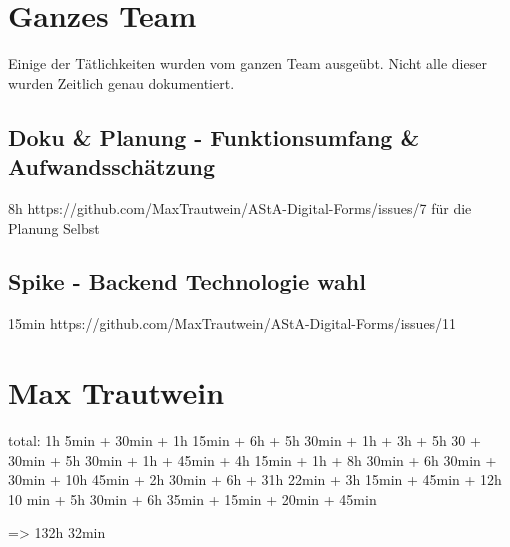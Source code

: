 \section{Ganzes Team}
Einige der Tätlichkeiten wurden vom ganzen Team ausgeübt.
Nicht alle dieser wurden Zeitlich genau dokumentiert.

\subsection{Doku & Planung - Funktionsumfang & Aufwandsschätzung}
8h
https://github.com/MaxTrautwein/AStA-Digital-Forms/issues/7
für die Planung Selbst

\subsection{Spike - Backend Technologie wahl }
15min
https://github.com/MaxTrautwein/AStA-Digital-Forms/issues/11

\section{Max Trautwein}\label{sec:max-trautwein}

total: 1h 5min + 30min + 1h 15min + 6h + 5h 30min + 1h + 3h + 5h 30 + 30min + 5h 30min + 1h + 45min + 4h 15min + 1h
+ 8h 30min + 6h 30min + 30min + 10h 45min + 2h 30min + 6h + 31h 22min + 3h 15min + 45min + 12h 10 min + 5h 30min + 6h 35min
+ 15min + 20min + 45min

=> 132h 32min

